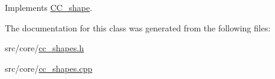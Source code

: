 Implements \hyperlink{a00037_aec026dc3fefc83bd03031e17307d073c}{C\-C\-\_\-shape}.



The documentation for this class was generated from the following files\-:\begin{DoxyCompactItemize}
\item 
src/core/\hyperlink{a00210}{cc\-\_\-shapes.\-h}\item 
src/core/\hyperlink{a00209}{cc\-\_\-shapes.\-cpp}\end{DoxyCompactItemize}
